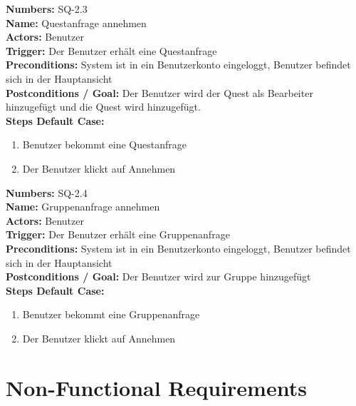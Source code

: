 \documentclass{article}
\begin{document}
\newpage

\begin{samepage}
\textbf{Numbers:} SQ-2.3\\
\textbf{Name:} Questanfrage annehmen\\
\textbf{Actors:}	Benutzer\\
\textbf{Trigger:} Der Benutzer erhält eine Questanfrage\\
\textbf{Preconditions:} System ist in ein Benutzerkonto eingeloggt, Benutzer befindet sich in der Hauptansicht\\
\textbf{Postconditions / Goal:} Der Benutzer wird der Quest als Bearbeiter hinzugefügt und die Quest wird hinzugefügt.\\
\textbf{Steps Default Case:}
\begin{enumerate}
	\item Benutzer bekommt eine Questanfrage
	\item Der Benutzer klickt auf Annehmen
\end{enumerate}
\end{samepage}

\newpage

\begin{samepage}
\textbf{Numbers:} SQ-2.4\\
\textbf{Name:} Gruppenanfrage annehmen\\
\textbf{Actors:}	Benutzer\\
\textbf{Trigger:} Der Benutzer erhält eine Gruppenanfrage\\
\textbf{Preconditions:} System ist in ein Benutzerkonto eingeloggt, Benutzer befindet sich in der Hauptansicht\\
\textbf{Postconditions / Goal:} Der Benutzer wird zur Gruppe hinzugefügt\\
\textbf{Steps Default Case:}
\begin{enumerate}
	\item Benutzer bekommt eine Gruppenanfrage
	\item Der Benutzer klickt auf Annehmen
\end{enumerate}
\end{samepage}

\newpage

\section{Non-Functional Requirements}
\end{document}
